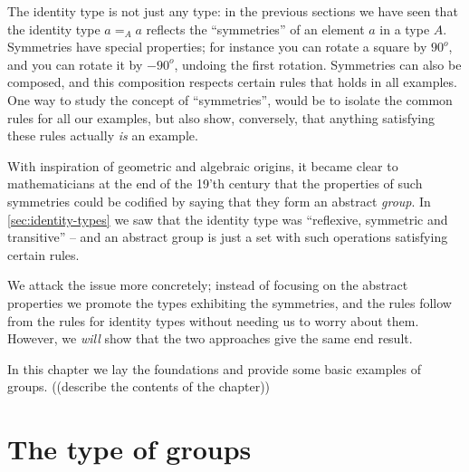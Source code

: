 \label{ch:groups}



The identity type is not just any type:  in the previous sections we have seen that the identity type $a=_Aa$ reflects the ``symmetries'' of an element $a$ in a type $A$.  
Symmetries have special properties; for instance you can rotate a square by $90^o$, and you can rotate it by $-90^o$, undoing the first rotation.
Symmetries can also be composed, and this composition respects certain rules that holds in all examples.  One way to study the concept of ``symmetries'', would be to isolate the common rules for all our examples, but also show, conversely, that anything satisfying these rules actually \emph{is} an example. 




With inspiration of geometric and algebraic origins, it became clear to mathematicians at the end of the 19'th century that the properties of such symmetries could be codified by saying that they form an abstract \emph{group}. 
In \cref{sec:identity-types} we saw that the identity type was ``reflexive, symmetric and transitive'' -- and an abstract group is just a set with such operations satisfying certain rules.


We attack the issue more concretely; instead of focusing on the abstract properties we promote the types exhibiting the symmetries, and the rules follow from the rules for identity types without needing us to worry about them.  However, we \emph{will} show that the two approaches give the same end result.  

In this chapter we lay the foundations and provide some basic examples of groups.  ((describe the contents of the chapter))

\section{The type of groups}
\label{sec:typegroup}

